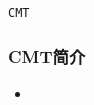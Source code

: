 
\begin{frame}
    \begin{center}
        \LARGE \tt{CMT}
    \end{center}
\end{frame}

\begin{frame}
    \frametitle{CMT简介}
    \begin{itemize}    
        \item
    \end{itemize}
\end{frame}

